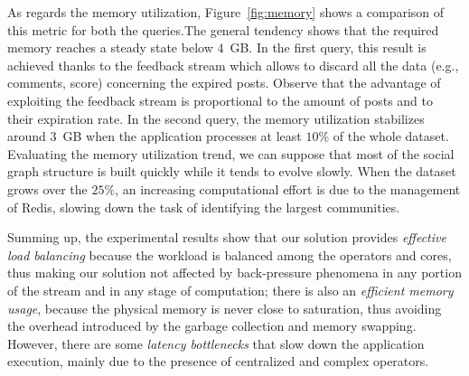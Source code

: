 As regards the memory utilization, Figure~\ref{fig:memory} shows a comparison of this metric for both the queries.The general tendency shows that the required memory reaches a steady state below $ 4 $~GB.
%
In the first query, this result is achieved thanks to the feedback stream which allows to discard all the data (e.g., comments, score) concerning the expired posts. 
%
Observe that the advantage of exploiting the feedback stream is proportional to the amount of posts and to their expiration rate.
%
In the second query, the memory utilization stabilizes around $ 3 $~GB when the application processes at least $ 10 \% $ of the whole dataset.
Evaluating the memory utilization trend, we can suppose that most of the social graph structure is built quickly while it tends to evolve slowly. 
%
When the dataset grows over the $ 25 \% $, an increasing computational effort is due to the management of Redis, slowing down the task of identifying the largest communities. 

Summing up, the experimental results show that our solution provides  \textit{effective load balancing} because the workload is balanced among the operators and cores, thus making our solution not affected by back-pressure phenomena in any portion of the stream and in any stage of computation;
there is also an \textit{efficient memory usage}, because the physical memory is never close to saturation, thus avoiding the overhead introduced by the garbage collection and memory swapping. 
However, there are some \textit{latency bottlenecks} that slow down the application execution, mainly due to the presence of centralized and complex operators. 

